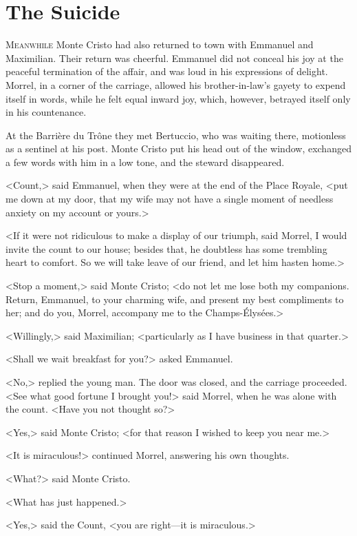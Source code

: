 \chapter{The Suicide} 

 \lettrine{M}{eanwhile} Monte Cristo had also returned to town with Emmanuel and Maximilian. Their return was cheerful. Emmanuel did not conceal his joy at the peaceful termination of the affair, and was loud in his expressions of delight. Morrel, in a corner of the carriage, allowed his brother-in-law's gayety to expend itself in words, while he felt equal inward joy, which, however, betrayed itself only in his countenance. 

 At the Barrière du Trône they met Bertuccio, who was waiting there, motionless as a sentinel at his post. Monte Cristo put his head out of the window, exchanged a few words with him in a low tone, and the steward disappeared. 

 <Count,> said Emmanuel, when they were at the end of the Place Royale, <put me down at my door, that my wife may not have a single moment of needless anxiety on my account or yours.> 

 <If it were not ridiculous to make a display of our triumph, said Morrel, I would invite the count to our house; besides that, he doubtless has some trembling heart to comfort. So we will take leave of our friend, and let him hasten home.> 

 <Stop a moment,> said Monte Cristo; <do not let me lose both my companions. Return, Emmanuel, to your charming wife, and present my best compliments to her; and do you, Morrel, accompany me to the Champs-Élysées.> 

 <Willingly,> said Maximilian; <particularly as I have business in that quarter.> 

 <Shall we wait breakfast for you?> asked Emmanuel. 

 <No,> replied the young man. The door was closed, and the carriage proceeded. <See what good fortune I brought you!> said Morrel, when he was alone with the count. <Have you not thought so?> 

 <Yes,> said Monte Cristo; <for that reason I wished to keep you near me.> 

 <It is miraculous!> continued Morrel, answering his own thoughts. 

 <What?> said Monte Cristo. 

 <What has just happened.> 

 <Yes,> said the Count, <you are right—it is miraculous.> 

